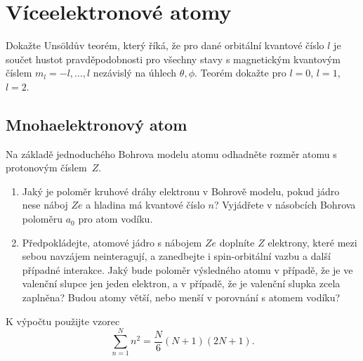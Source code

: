 \section{Víceelektronové atomy}
    Dokažte Unsöldův teorém, který říká, že pro dané orbitální kvantové číslo $l$ je součet hustot pravděpodobnosti pro všechny stavy s magnetickým kvantovým číslem $m_l=-l,\dotsc,l$ nezávislý na úhlech $\theta,\phi$.
    Teorém dokažte pro $l=0$, $l=1$, $l=2$.

\subsection{Mnohaelektronový atom}
    Na základě jednoduchého Bohrova modelu atomu odhadněte rozměr atomu s protonovým číslem~$Z$.

    \begin{enumerate}
    \item
        Jaký je poloměr kruhové dráhy elektronu v Bohrově modelu, pokud jádro nese náboj $Ze$ a hladina má kvantové číslo $n$?
        Vyjádřete v násobcích Bohrova poloměru $a_{0}$ pro atom vodíku.

    \item
        Předpokládejte, atomové jádro s nábojem $Ze$ doplníte $Z$ elektrony, které mezi sebou navzájem neinteragují, a zanedbejte i spin-orbitální vazbu a další případné interakce.
        Jaký bude poloměr výsledného atomu v případě, že je ve valenční slupce jen jeden elektron, a v případě, že je valenční slupka zcela zaplněna?
        Budou atomy větší, nebo menší v porovnání s atomem vodíku?
    \end{enumerate}

    K výpočtu použijte vzorec
    \begin{equation}
        \sum_{n=1}^{N}n^{2}=\frac{N}{6}(N+1)(2N+1).
    \end{equation}